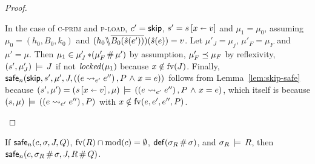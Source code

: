 \documentclass[11pt]{article}
\begin{document}
\begin{proof}
\begin{enumerate}
		In the case of \textsc{c-prim} and \textsc{p-load}, $c' = \operatorname{\mathsf{skip}}$, $s' = s \left[ x \shortleftarrow v \right]$ and $\mu_1 = \mu_0$, assuming $\mu_0 = (h_0,B_0,k_0)$ and $(h_0 \backslash\!\!\backslash \overline{B_0(\hat{s}(e'))})(\hat{s}(e)) = v$. Let $\mu'_J = \mu_j$, $\mu'_F = \mu_F$ and $\mu' = \mu$. Then $\mu_1 \in \mu'_J \operatorname{\ast} (\mu'_F \operatorname{\#} \mu')$ by assumption, $\mu'_F \preceq \mu_F$ by reflexivity, $(s',\mu'_J) \,\models\, J$ if not $\mathit{locked}(\mu_1)$ because $x \notin \mathrm{fv}(J)$. Finally, $\mathsf{safe}_{n}(\operatorname{\mathsf{skip}},s',\mu',J,((e \leadsto_{e'} e'') \operatorname{,} P \operatorname{\,\wedge\,} x = e))$ follows from Lemma~\ref{lem:skip-safe} because $(s',\mu') = (s \left[ x \shortleftarrow v \right],\mu) \,\models\, ((e \leadsto_{e'} e'') \operatorname{,} P \operatorname{\,\wedge\,} x = e)$, which itself is because $(s,\mu) \,\models\, ((e \leadsto_{e'} e'') \operatorname{,} P)$ with $x \notin \mathrm{fv}(e,e',e'',P)$. 
	\end{enumerate}

\end{proof}

\begin{lemma}
	\label{lem:weak-interleaving-safe}
	If $\mathsf{safe}_{n}(c,\sigma,J,Q)$, $\mathrm{fv}(R) \cap \mathrm{mod}(c) = \operatorname{\emptyset}$, $\mathsf{def}(\sigma_R \operatorname{\#} \sigma)$, and $\sigma_R \,\models\, R$, then $\mathsf{safe}_{n}(c, \sigma_R \operatorname{\#} \sigma,J,R \operatorname{\#} Q)$. 
\end{lemma}
\end{document}
